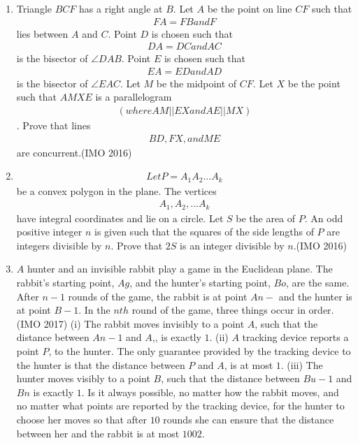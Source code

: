 \begin{enumerate}
 \item Triangle $BCF$ has a right angle at $B$. Let $A$ be the point on line $CF$ such that \begin{align}FA=FB and F\end{align} lies between $A$ and $C$. Point $D$ is chosen such that \begin{align}DA = DC and AC\end{align} is the bisector of $\angle DAB.$ Point $E$ is chosen such that \begin{align}EA= ED and AD\end{align} is the bisector of $\angle EAC$. Let $M$ be the midpoint of $CF$. Let $X$ be the point such that $AMXE$ is a parallelogram \begin{align}(where AM || EX and AE || MX)\end{align}. Prove that lines \begin{align}BD, FX, and ME\end{align} are concurrent.\hfill (IMO 2016)
\item \begin{align}Let P=A_1A_2... A_k\end{align} be a convex polygon in the plane. The vertices \begin{align}A_1, A_2,... A_k \end{align} have integral coordinates and lie on a circle. Let $S$ be the area of $P$. An odd positive integer $n$ is given such that the squares of the side lengths of $P$ are integers divisible by $n$. Prove that $2S$ is an integer divisible by $n$.\hfill(IMO 2016)
\item $A$ hunter and an invisible rabbit play a game in the Euclidean plane. The rabbit's starting point, $Ag$, and the hunter's starting point, $Bo$, are the same. After $n-1$ rounds of the game, the rabbit is at point $An-$ and the hunter is at point $B-1$. In the $nth$ round of the game, three things occur in order.\hfill (IMO 2017)        
	(i) The rabbit moves invisibly to a point $A$, such that the distance between $An-1$ and $A$,, is exactly $1$.                    
	(ii) $A$ tracking device reports a point $P$, to the hunter. The only guarantee provided by the tracking device to the hunter is that the distance between $P$ and $A$, is at most $1$.
 (iii) The hunter moves visibly to a point $B$, such that the distance between $Bu-1$ and $Bn$ is exactly $1$. Is it always possible, no matter how the rabbit moves, and no matter what points are reported by the tracking device, for the hunter to choose her moves so that after $10$ rounds she can ensure that the distance between her and the rabbit is at most $1002.$

\end{enumerate}
